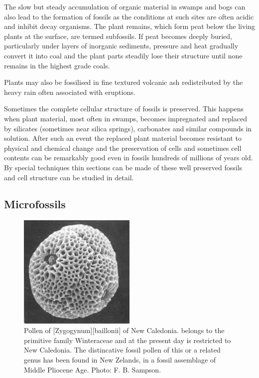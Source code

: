 The slow but steady accumulation of organic material in swamps and bogs can also lead to the formation of fossils as the conditions at such sites are often acidic and inhibit decay organisms.
The plant remains, which form peat below the living plants at the surface, are termed subfossils.
If peat becomes deeply buried, particularly under layers of inorganic sediments, pressure and heat gradually convert it into coal and the plant parts steadily lose their structure until none remains in the highest grade coals.

Plants may also be fossilised in fine textured volcanic ash redistributed by the heavy rain often associated with eruptions.

Sometimes the complete cellular structure of fossils is preserved.
This happens when plant material, most often in swamps, becomes impregnated and replaced by silicates (sometimes near silica springs), carbonates and similar compounds in solution.
After such an event the replaced plant material becomes resistant to physical and chemical change and the preservation of cells and sometimes cell contents can be remarkably good even in fossils hundreds of millions of years old.
By special techniques thin sections can be made of these well preserved fossils and cell structure can be studied in detail.

\subsection{Microfossils}

\begin{figure}
	\includegraphics[width=0.5\textwidth]{graphics/figure122pollen.jpg}
	\centering
	\caption[Pollen of \emph{Zygogynum baillonii} of New Caledonia]{Pollen of [Zygogynum][baillonii] of New Caledonia.  belongs to the primitive family Winteraceae and at the present day is restricted to New Caledonia.
	The distincative fossil pollen of this or a related genus has been found in New Zelands, in a fossil assemblage of Middle Pliocene Age.
	Photo: F. B. Sampson.}%
	\label{fig:122pollen}
\end{figure}

